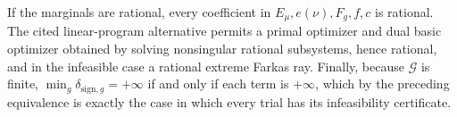 If the marginals are rational, every coefficient in \(E_\mu,e(\nu),F_g,f,c\) is rational.  The cited linear-program alternative permits a primal optimizer and dual basic optimizer obtained by solving nonsingular rational subsystems, hence rational, and in the infeasible case a rational extreme Farkas ray.  Finally, because \(\mathcal G\) is finite,
\(\min_g\delta_{\mathrm{sign},g}=+\infty\) if and only if each term is \(+\infty\), which by the preceding equivalence is exactly the case in which every trial has its infeasibility certificate.
